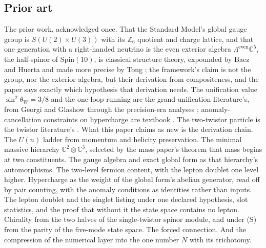 \documentclass[11pt]{article}
\theoremstyle{definition}
\theoremstyle{plain}
\providecommand{\C}{}\renewcommand{\C}{\mathbb{C}}
\begin{document}
\subsection*{Prior art}
\label{c:note.standard-model.setting-prior-art}
The prior work, acknowledged once. That the Standard Model's global gauge group is $S(U(2) \times U(3))$ with its $\mathbb{Z}_{6}$ quotient and charge lattice, and that one generation with a right-handed neutrino is the even exterior algebra $\Lambda^{\mathrm{even}}\C^{5}$, the half-spinor of $\mathrm{Spin}(10)$, is classical structure theory, expounded by Baez and Huerta \cite{BaezHuerta2010} and made more precise by Tong \cite{Tong2017}; the framework's claim is not the group, nor the exterior algebra, but their derivation from compositeness, and the paper says exactly which hypothesis that derivation needs. The unification value $\sin^{2}\theta_{W} = 3/8$ and the one-loop running are the grand-unification literature's, from Georgi and Glashow \cite{GeorgiGlashow1974} through the precision-era analyses \cite{Amaldi1991}; anomaly-cancellation constraints on hypercharge are textbook \cite{WeinbergQFT2}. The two-twistor particle is the twistor literature's \cite{PenroseRindler1986}. What this paper claims as new is the derivation chain. The $U(n)$ ladder from momentum and helicity preservation. The minimal massive hierarchy $\C^{2}\otimes\C^{3}$, selected by the mass paper's theorem that mass begins at two constituents. The gauge algebra and exact global form as that hierarchy's automorphisms. The two-level fermion content, with the lepton doublet one level higher. Hypercharge as the weight of the global form's abelian generator, read off by pair counting, with the anomaly conditions as identities rather than inputs. The lepton doublet and the singlet listing under one declared hypothesis, slot statistics, and the proof that without it the state space contains no lepton. Chirality from the two halves of the single-twistor spinor module, and under (S) from the parity of the five-mode state space. The forced connection. And the compression of the numerical layer into the one number $N$ with its trichotomy.
\end{document}

